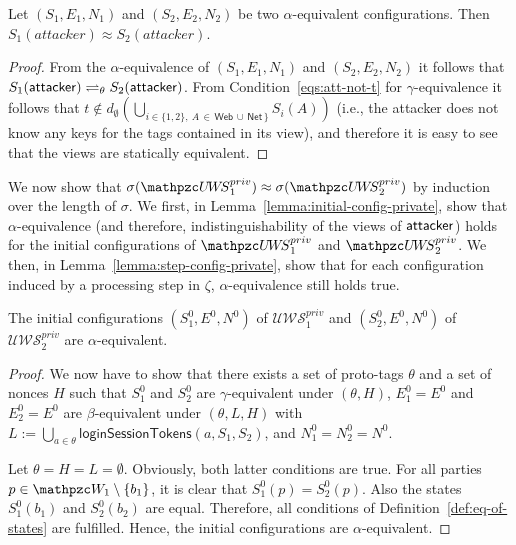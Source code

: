   \begin{lemma}
    Let $(S_1,E_1,N_1)$ and $(S_2,E_2,N_2)$ be two 
    $\alpha$-equivalent configurations. 
    Then $S_1(attacker)\approx S_2(attacker)$.
  \end{lemma}
  \begin{proof}
    From the $\alpha$-equivalence of $(S_1,E_1,N_1)$ and 
    $(S_2,E_2,N_2)$ it follows that $S_1(\mathsf{attacker}) 
    \rightleftharpoons_{\theta} S_2(\mathsf{attacker})$.
    From Condition~\ref{eqs:att-not-t} for $\gamma$-equivalence 
    it follows that
    $t \not\in d_\emptyset(\bigcup_{i \in \{1,2\},\ A\, \in\, 
    \mathsf{Web}\, \cup \, \mathsf{Net}\, \}}S_i(A))$
    (i.e., the attacker does not know any keys for the tags 
    contained in its view), and therefore it is easy to see 
    that the views are statically equivalent.
  \end{proof}
  
  We now show that $\sigma(\uppressoprivwebsystem_1) \approx
  \sigma(\uppressoprivwebsystem_2)$ by induction over the length 
  of $\sigma$. We first, in Lemma~\ref{lemma:initial-config-private}, 
  show that $\alpha$-equivalence (and therefore, indistinguishability 
  of the views of $\mathsf{attacker}$) holds for the initial 
  configurations of $\uppressoprivwebsystem_1$ and 
  $\uppressoprivwebsystem_2$. We then, in 
  Lemma~\ref{lemma:step-config-private}, show that for each 
  configuration induced by a processing step in $\zeta$,
  $\alpha$-equivalence still holds true.
  
  \begin{lemma}\label{lemma:initial-config-private}
    The initial configurations $(S_1^0,E^0,N^0)$ of 
    $\mathcal{U\!W\!S}^{priv}_1$ and $(S_2^0,E^0,N^0)$ of 
    $\mathcal{U\!W\!S}^{priv}_2$ are $\alpha$-equivalent.
  \end{lemma}
  \begin{proof}
    We now have to show that there exists a set of proto-tags $\theta$ and a set of nonces $H$
    such that $S_1^0$ and $S_2^0$ are $\gamma$-equivalent under
    $(\theta,H)$, $E_1^0 = E^0$ and $E_2^0 = E^0$ are $\beta$-equivalent
    under $(\theta,L,H)$ with $L := \bigcup_{a\in\theta} \mathsf{loginSessionTokens}(a,S_1,S_2)$, and $N_1^0 = N_2^0 = N^0$.
  
    Let $\theta = H = L = \emptyset$. Obviously, both latter conditions are
    true. For all parties $p \in \bidsystem_1 \setminus \{b_1\}$, it is
    clear that $S_1^0(p) = S_2^0(p)$. Also the states $S_1^0(b_1)$ and
    $S_2^0(b_2)$ are equal. Therefore, all conditions
    of Definition~\ref{def:eq-of-states} are fulfilled. Hence, the
    initial configurations are $\alpha$-equivalent.
  \end{proof}
  
